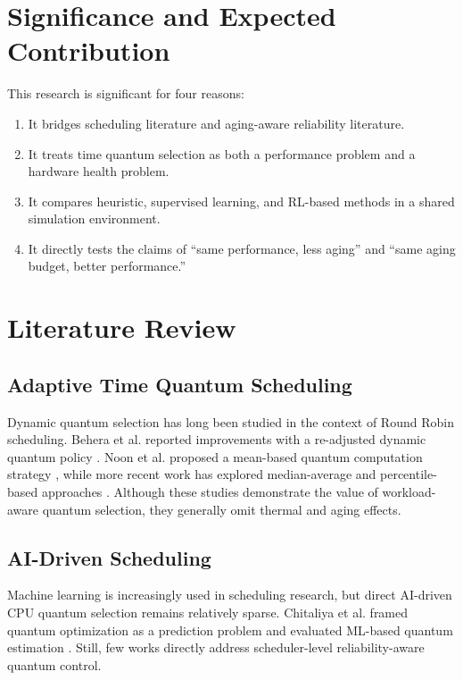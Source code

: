 \documentclass[12pt,a4paper]{article}
\begin{document}
\section{Significance and Expected Contribution}

This research is significant for four reasons:

\begin{enumerate}[leftmargin=*]
\item It bridges scheduling literature and aging-aware reliability literature.
\item It treats time quantum selection as both a performance problem and a hardware health problem.
\item It compares heuristic, supervised learning, and RL-based methods in a shared simulation environment.
\item It directly tests the claims of ``same performance, less aging'' and ``same aging budget, better performance.''
\end{enumerate}

\section{Literature Review}

\subsection{Adaptive Time Quantum Scheduling}

Dynamic quantum selection has long been studied in the context of Round Robin scheduling. Behera et al.
reported improvements with a re-adjusted dynamic quantum policy \cite{behera2010}. Noon et al.
proposed a mean-based quantum computation strategy \cite{noon2011}, while more recent work has explored
median-average and percentile-based approaches \cite{marr2022,zohora2024}. Although these studies demonstrate
the value of workload-aware quantum selection, they generally omit thermal and aging effects.

\subsection{AI-Driven Scheduling}

Machine learning is increasingly used in scheduling research, but direct AI-driven CPU quantum selection remains
relatively sparse. Chitaliya et al.
framed quantum optimization as a prediction problem and evaluated ML-based quantum estimation \cite{chitaliya2023}.
Still, few works directly address scheduler-level reliability-aware quantum control.
\end{document}

